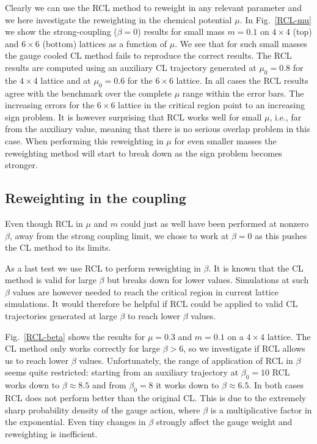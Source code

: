 \documentclass{PoS}
\begin{document}
Clearly we can use the RCL method to reweight in any relevant parameter and we here investigate the reweighting in the chemical potential $\mu$. In Fig.\ \ref{RCL-mu} we show the strong-coupling ($\beta=0$) results for small mass $m=0.1$ on $4\times4$ (top) and $6\times6$ (bottom) lattices as a function of $\mu$. We see that for such small masses the gauge cooled CL method fails to reproduce the correct results. The RCL results are computed using an auxiliary CL trajectory generated at $\mu_0=0.8$ for the $4\times4$ lattice and at $\mu_0=0.6$ for the $6\times6$ lattice. In all cases the RCL results agree with the benchmark over the complete $\mu$ range within the error bars. The increasing errors for the $6\times6$ lattice in the critical region point to an increasing sign problem. It is however surprising that RCL works well for small $\mu$, i.e., far from the auxiliary value, meaning that there is no serious overlap problem in this case. When performing this reweighting in $\mu$ for even smaller masses the reweighting method will start to break down as the sign problem becomes stronger.


\subsection{Reweighting in the coupling}

Even though RCL in $\mu$ and $m$ could just as well have been performed at nonzero $\beta$, away from the strong coupling limit, we chose to work at $\beta=0$ as this pushes the CL method to its limits.

As a last test we use RCL to perform reweighting in $\beta$. It is known that the CL method is valid for large $\beta$ but breaks down for lower values. Simulations at such $\beta$ values are however needed to reach the critical region in current lattice simulations. It would therefore be helpful if RCL could be applied to valid CL trajectories generated at large $\beta$ to reach lower $\beta$ values. 

Fig.\ \ref{RCL-beta} shows the results for $\mu=0.3$ and $m=0.1$ on a $4\times4$ lattice. The CL method only works correctly for large $\beta>6$, so we investigate if RCL allows us to reach lower $\beta$ values. Unfortunately, the range of application of RCL in $\beta$ seems quite restricted: starting from an auxiliary trajectory at $\beta_0=10$ RCL works down to $\beta\approx8.5$ and from $\beta_0=8$ it works down to $\beta\approx6.5$. In both cases RCL does not perform better than the original CL. This is due to the extremely sharp probability density of the gauge action, where $\beta$ is a multiplicative factor in the exponential. Even tiny changes in $\beta$ strongly affect the gauge weight and reweighting is inefficient.
\end{document}
